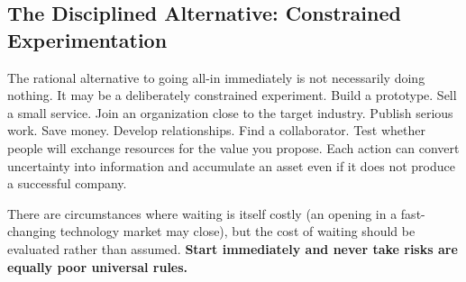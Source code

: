 \subsection{The Disciplined Alternative: Constrained Experimentation}

The rational alternative to going all-in immediately is not necessarily doing nothing. It may be a deliberately constrained experiment. Build a prototype. Sell a small service. Join an organization close to the target industry. Publish serious work. Save money. Develop relationships. Find a collaborator. Test whether people will exchange resources for the value you propose. Each action can convert uncertainty into information and accumulate an asset even if it does not produce a successful company.

There are circumstances where waiting is itself costly (an opening in a fast-changing technology market may close), but the cost of waiting should be evaluated rather than assumed. \textbf{Start immediately and never take risks are equally poor universal rules.}

